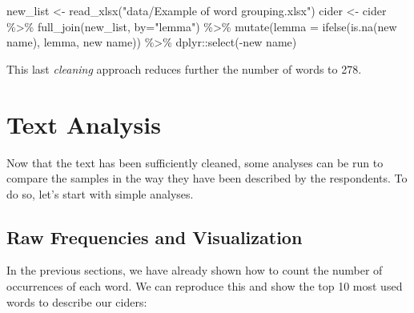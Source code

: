 \documentclass[
]{krantz}
\makeatletter
\newenvironment{Shaded}{\begin{snugshade}}{\end{snugshade}}
\newcommand{\AttributeTok}[1]{\textcolor[rgb]{0.61,0.61,0.61}{#1}}
\newcommand{\FunctionTok}[1]{\textcolor[rgb]{0,0,0}{#1}}
\newcommand{\NormalTok}[1]{#1}
\newcommand{\OtherTok}[1]{\textcolor[rgb]{0.37,0.37,0.37}{#1}}
\newcommand{\SpecialCharTok}[1]{\textcolor[rgb]{0,0,0}{#1}}
\newcommand{\StringTok}[1]{\textcolor[rgb]{0.5,0.5,0.5}{#1}}
\newenvironment{kframe}{%
\medskip{}
\setlength{\fboxsep}{.8em}
 \def\at@end@of@kframe{}%
 \ifinner\ifhmode%
  \def\at@end@of@kframe{\end{minipage}}%
  \begin{minipage}{\columnwidth}%
 \fi\fi%
 \def\FrameCommand##1{\hskip\@totalleftmargin \hskip-\fboxsep
 \colorbox{shadecolor}{##1}\hskip-\fboxsep
     \hskip-\linewidth \hskip-\@totalleftmargin \hskip\columnwidth}%
 \MakeFramed {\advance\hsize-\width
   \@totalleftmargin\z@ \linewidth\hsize
   \@setminipage}}%
 {\par\unskip\endMakeFramed%
 \at@end@of@kframe}
\renewenvironment{Shaded}{\begin{kframe}}{\end{kframe}}
\makeatother
\begin{document}
\begin{Shaded}
\begin{Highlighting}[]
\NormalTok{new\_list }\OtherTok{\textless{}{-}} \FunctionTok{read\_xlsx}\NormalTok{(}\StringTok{"data/Example of word grouping.xlsx"}\NormalTok{)}
\NormalTok{cider }\OtherTok{\textless{}{-}}\NormalTok{ cider }\SpecialCharTok{\%\textgreater{}\%} 
  \FunctionTok{full\_join}\NormalTok{(new\_list, }\AttributeTok{by=}\StringTok{"lemma"}\NormalTok{) }\SpecialCharTok{\%\textgreater{}\%} 
  \FunctionTok{mutate}\NormalTok{(}\AttributeTok{lemma =} \FunctionTok{ifelse}\NormalTok{(}\FunctionTok{is.na}\NormalTok{(}\StringTok{\textasciigrave{}}\AttributeTok{new name}\StringTok{\textasciigrave{}}\NormalTok{), lemma, }\StringTok{\textasciigrave{}}\AttributeTok{new name}\StringTok{\textasciigrave{}}\NormalTok{)) }\SpecialCharTok{\%\textgreater{}\%} 
\NormalTok{  dplyr}\SpecialCharTok{::}\FunctionTok{select}\NormalTok{(}\SpecialCharTok{{-}}\StringTok{\textasciigrave{}}\AttributeTok{new name}\StringTok{\textasciigrave{}}\NormalTok{)}
\end{Highlighting}
\end{Shaded}

This last \emph{cleaning} approach reduces further the number of words to 278.

\hypertarget{text-analysis-1}{%
\section{Text Analysis}\label{text-analysis-1}}

Now that the text has been sufficiently cleaned, some analyses can be run to compare the samples in the way they have been described by the respondents. To do so, let's start with simple analyses.

\hypertarget{raw-frequencies-and-visualization}{%
\subsection{Raw Frequencies and Visualization}\label{raw-frequencies-and-visualization}}

In the previous sections, we have already shown how to count the number of occurrences of each word. We can reproduce this and show the top 10 most used words to describe our ciders:
\end{document}
